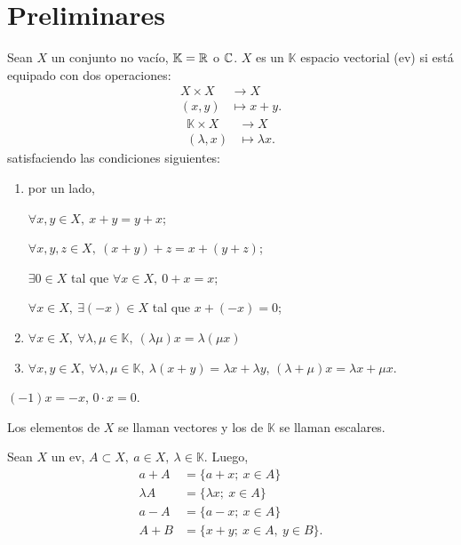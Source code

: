 
\section{Preliminares}

\begin{definition}
	Sean $X$ un conjunto no vacío, $\mathbb{K} = \mathbb{R}$ o $\mathbb{C}$. $X$ es un $\mathbb{K}$ espacio vectorial (ev) si está equipado con dos operaciones:
	\begin{align*}
		X \times X &\to X \\
		(x,y) &\mapsto x + y
	.\end{align*}
	\begin{align*}
		\mathbb{K} \times X &\to X \\
		(\lambda,x) &\mapsto \lambda x
	.\end{align*}
	satisfaciendo las condiciones siguientes:
	\begin{enumerate}
		\item por un lado,

		\subitem $\forall x,y \in X,\ x + y = y + x$;

		\subitem $\forall x,y,z \in X,\ (x + y) + z = x + (y + z)$;

		\subitem $\exists 0 \in X$ tal que $\forall x \in X,\ 0 + x = x$;

		\subitem $\forall x \in X,\ \exists (-x) \in X$ tal que $x + (-x) = 0$;

		\item $\forall x \in X,\ \forall \lambda,\mu \in \mathbb{K},\ (\lambda \mu) x = \lambda (\mu x)$

		\item $\forall x,y \in X,\ \forall \lambda,\mu \in \mathbb{K},\ \lambda (x + y) = \lambda x + \lambda y$, $(\lambda + \mu) x = \lambda x + \mu x$.
	\end{enumerate}
\end{definition}

\begin{eg}
	$(-1) x = -x$, $0 \cdot x = 0$.
\end{eg}

Los elementos de $X$ se llaman vectores y los de $\mathbb{K}$ se llaman escalares.

\begin{notation}
	Sean $X$ un ev, $A \subset X,\ a \in X,\ \lambda \in \mathbb{K}$. Luego,
	\begin{align*}
		a + A &= \{ a + x;\ x \in A \} \\
		\lambda A &= \{ \lambda x;\ x \in A \} \\
		a - A &= \{ a - x;\ x \in A \} \\
		A + B &= \{ x + y;\ x \in A,\ y \in B \}
	.\end{align*}
\end{notation}

